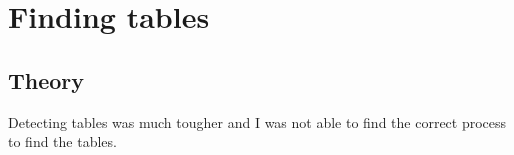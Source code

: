 \section{Finding tables}
\subsection{Theory}
Detecting tables was much tougher and I was not able to find the correct process to find the tables.
